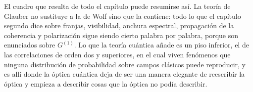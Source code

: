     El cuadro que resulta de todo el capítulo puede resumirse así. La teoría de Glauber no sustituye a la de Wolf sino que la contiene: todo lo que el capítulo segundo dice sobre franjas, visibilidad, anchura espectral, propagación de la coherencia y polarización sigue siendo cierto palabra por palabra, porque son enunciados sobre $G^{(1)}$. Lo que la teoría cuántica añade es un piso inferior, el de las correlaciones de orden dos y superiores, en el cual viven fenómenos que ninguna distribución de probabilidad sobre campos clásicos puede reproducir, y es allí donde la óptica cuántica deja de ser una manera elegante de reescribir la óptica y empieza a describir cosas que la óptica no podía describir.
